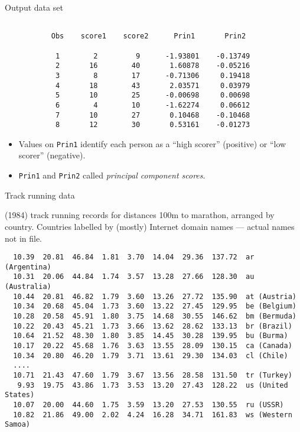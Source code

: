 \documentclass[pdf]{prosper}
\begin{document}
\begin{slide}{Output data set}

{\scriptsize
\begin{verbatim}

           Obs    score1    score2      Prin1       Prin2

            1        2         9      -1.93801    -0.13749
            2       16        40       1.60878    -0.05216
            3        8        17      -0.71306     0.19418
            4       18        43       2.03571     0.03979
            5       10        25      -0.00698     0.00698
            6        4        10      -1.62274     0.06612
            7       10        27       0.10468    -0.10468
            8       12        30       0.53161    -0.01273

\end{verbatim}
}

\begin{itemize}
\item Values on \verb-Prin1- identify each person as a ``high scorer'' (positive) or ``low scorer'' (negative).
\item \verb-Prin1- and \verb-Prin2- called {\em principal
    component scores}.
\end{itemize}
  
\end{slide}

\begin{slide}{Track running data}

(1984) track running records for distances 100m to marathon, arranged by country. Countries labelled by (mostly) Internet domain names --- actual names not in file. 

{\scriptsize
\begin{verbatim}
  10.39  20.81  46.84  1.81  3.70  14.04  29.36  137.72  ar (Argentina)
  10.31  20.06  44.84  1.74  3.57  13.28  27.66  128.30  au (Australia)
  10.44  20.81  46.82  1.79  3.60  13.26  27.72  135.90  at (Austria)
  10.34  20.68  45.04  1.73  3.60  13.22  27.45  129.95  be (Belgium)
  10.28  20.58  45.91  1.80  3.75  14.68  30.55  146.62  bm (Bermuda)
  10.22  20.43  45.21  1.73  3.66  13.62  28.62  133.13  br (Brazil)
  10.64  21.52  48.30  1.80  3.85  14.45  30.28  139.95  bu (Burma)
  10.17  20.22  45.68  1.76  3.63  13.55  28.09  130.15  ca (Canada)
  10.34  20.80  46.20  1.79  3.71  13.61  29.30  134.03  cl (Chile)
  ....
  10.71  21.43  47.60  1.79  3.67  13.56  28.58  131.50  tr (Turkey)
   9.93  19.75  43.86  1.73  3.53  13.20  27.43  128.22  us (United States)
  10.07  20.00  44.60  1.75  3.59  13.20  27.53  130.55  ru (USSR)
  10.82  21.86  49.00  2.02  4.24  16.28  34.71  161.83  ws (Western Samoa)
\end{verbatim}
}
  
\end{slide}
\end{document}
